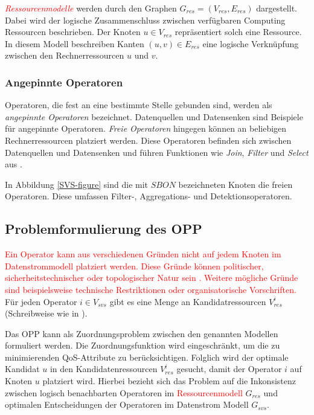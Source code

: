 \documentclass{article}
\begin{document}
\textcolor{red}{\textit{Ressourcenmodelle}} werden durch den Graphen $G_{res} = (V_{res}, E_{res})$ dargestellt. 
Dabei wird der logische Zusammenschluss zwischen verfügbaren Computing Ressourcen beschrieben. Der Knoten $u \in V_{res}$ 
repräsentiert solch eine Ressource. In diesem Modell beschreiben Kanten $(u,v) \in E_{res}$ 
eine logische Verknüpfung zwischen den Rechnerressourcen $u$ und $v$.


\subsubsection{Angepinnte Operatoren}
Operatoren, die fest an eine bestimmte Stelle gebunden sind, werden als \textit{angepinnte Operatoren} bezeichnet. 
Datenquellen und Datensenken sind Beispiele für angepinnte Operatoren. 
\textit{Freie Operatoren} hingegen können an beliebigen Rechnerressourcen platziert werden. Diese Operatoren befinden sich zwischen Datenquellen und Datensenken und führen 
Funktionen wie \textit{Join}, \textit{Filter} und \textit{Select} aus \cite{network-aware-op}.

In Abbildung \ref{SVS-figure} sind die mit $SBON$ bezeichneten Knoten die freien Operatoren. Diese umfassen Filter-, Aggregations- und Detektionsoperatoren.

\subsection{Problemformulierung des OPP} \label{OPP-Definition}
\textcolor{red}{Ein Operator kann aus verschiedenen Gründen nicht auf jedem Knoten im Datenstrommodell platziert werden. Diese Gründe können politischer, 
sicherheitstechnischer oder topologischer Natur sein \cite{cardellini-optimal_operatorplc}. 
Weitere mögliche Gründe sind beispielsweise technische Restriktionen oder organisatorische Vorschriften.}
Für jeden Operator $i \in V_{svs}$ gibt es eine Menge an Kandidatressourcen $V_{res}^i$ (Schreibweise wie in \cite{efficient-operator-placement}).

Das OPP kann als Zuordnungsproblem zwischen den genannten Modellen formuliert werden. 
Die Zuordnungsfunktion wird eingeschränkt, um die zu minimierenden QoS-Attribute zu berücksichtigen. 
Folglich wird der optimale Kandidat $u$ in den Kandidatenressourcen $V_{res}^i$
gesucht, damit der Operator $i$ auf Knoten $u$ platziert wird.
Hierbei bezieht sich das Problem auf die Inkonsistenz zwischen 
logisch benachbarten Operatoren im \textcolor{red}{Ressourcenmodell} $G_{res}$ und optimalen Entscheidungen der Operatoren im Datenstrom Modell $G_{svs}$.
\end{document}

